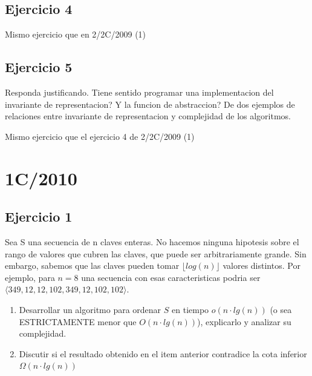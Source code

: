 \documentclass[10pt, a4paper]{report}
\begin{document}
\subsection*{Ejercicio 4}

Mismo ejercicio que en 2/2C/2009 (1)

\subsection*{Ejercicio 5}

Responda justificando.
Tiene sentido programar una implementacion del invariante de representacion?
Y la funcion de abstraccion?
De dos ejemplos de relaciones entre invariante de representacion y complejidad de los algoritmos.

Mismo ejercicio que el ejercicio 4 de 2/2C/2009 (1)

\newpage
\section{1C/2010}

\subsection*{Ejercicio 1}

Sea S una secuencia de n claves enteras. No hacemos ninguna hipotesis sobre el rango de valores que cubren las claves, que puede ser arbitrariamente grande. Sin embargo, sabemos que las claves pueden tomar $\lfloor log(n) \rfloor$ valores distintos. Por ejemplo, para $n=8$ una secuencia con esas caracteristicas podria ser $\langle349, 12, 12, 102, 349, 12, 102, 102\rangle$.

\begin{enumerate}
 \item Desarrollar un algoritmo para ordenar $S$ en tiempo $o(n\cdot lg(n))$ (o sea ESTRICTAMENTE menor que $O(n\cdot lg(n))$), explicarlo y analizar su complejidad.
 \item Discutir si el resultado obtenido en el item anterior contradice la cota inferior $\Omega(n\cdot lg(n))$
\end{enumerate}
\end{document}
